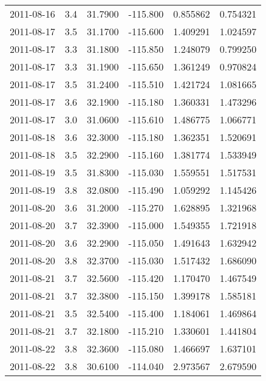 \begin{tabular}{lrrrrr}
2011-08-16 &       3.4 &  31.7900 &  -115.800 &         0.855862 &         0.754321 \\
2011-08-17 &       3.5 &  31.1700 &  -115.600 &         1.409291 &         1.024597 \\
2011-08-17 &       3.3 &  31.1800 &  -115.850 &         1.248079 &         0.799250 \\
2011-08-17 &       3.3 &  31.1900 &  -115.650 &         1.361249 &         0.970824 \\
2011-08-17 &       3.5 &  31.2400 &  -115.510 &         1.421724 &         1.081665 \\
2011-08-17 &       3.6 &  32.1900 &  -115.180 &         1.360331 &         1.473296 \\
2011-08-17 &       3.0 &  31.0600 &  -115.610 &         1.486775 &         1.066771 \\
2011-08-18 &       3.6 &  32.3000 &  -115.180 &         1.362351 &         1.520691 \\
2011-08-18 &       3.5 &  32.2900 &  -115.160 &         1.381774 &         1.533949 \\
2011-08-19 &       3.5 &  31.8300 &  -115.030 &         1.559551 &         1.517531 \\
2011-08-19 &       3.8 &  32.0800 &  -115.490 &         1.059292 &         1.145426 \\
2011-08-20 &       3.6 &  31.2000 &  -115.270 &         1.628895 &         1.321968 \\
2011-08-20 &       3.7 &  32.3900 &  -115.000 &         1.549355 &         1.721918 \\
2011-08-20 &       3.6 &  32.2900 &  -115.050 &         1.491643 &         1.632942 \\
2011-08-20 &       3.8 &  32.3700 &  -115.030 &         1.517432 &         1.686090 \\
2011-08-21 &       3.7 &  32.5600 &  -115.420 &         1.170470 &         1.467549 \\
2011-08-21 &       3.7 &  32.3800 &  -115.150 &         1.399178 &         1.585181 \\
2011-08-21 &       3.5 &  32.5400 &  -115.400 &         1.184061 &         1.469864 \\
2011-08-21 &       3.7 &  32.1800 &  -115.210 &         1.330601 &         1.441804 \\
2011-08-22 &       3.8 &  32.3600 &  -115.080 &         1.466697 &         1.637101 \\
2011-08-22 &       3.8 &  30.6100 &  -114.040 &         2.973567 &         2.679590 \\

\end{tabular}
